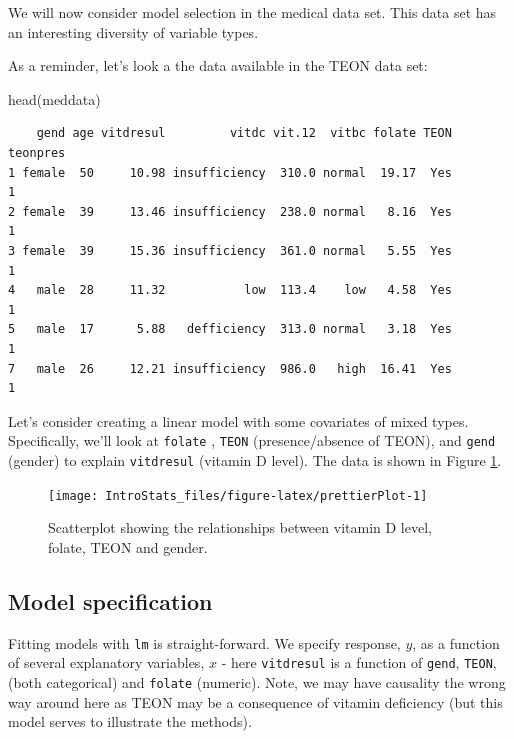 \documentclass[
  oneside]{krantz}
\newenvironment{Shaded}{\begin{snugshade}}{\end{snugshade}}
\newcommand{\FunctionTok}[1]{\textcolor[rgb]{0.00,0.00,0.00}{#1}}
\newcommand{\NormalTok}[1]{#1}
\begin{document}
We will now consider model selection in the medical data set. This data set has an interesting diversity of variable types.

As a reminder, let's look a the data available in the TEON data set:

\begin{Shaded}
\begin{Highlighting}[]
\FunctionTok{head}\NormalTok{(meddata)}
\end{Highlighting}
\end{Shaded}

\begin{verbatim}
    gend age vitdresul         vitdc vit.12  vitbc folate TEON teonpres
1 female  50     10.98 insufficiency  310.0 normal  19.17  Yes        1
2 female  39     13.46 insufficiency  238.0 normal   8.16  Yes        1
3 female  39     15.36 insufficiency  361.0 normal   5.55  Yes        1
4   male  28     11.32           low  113.4    low   4.58  Yes        1
5   male  17      5.88   defficiency  313.0 normal   3.18  Yes        1
7   male  26     12.21 insufficiency  986.0   high  16.41  Yes        1
\end{verbatim}

Let's consider creating a linear model with some covariates of mixed types. Specifically, we'll look at \texttt{folate} , \texttt{TEON} (presence/absence of TEON), and \texttt{gend} (gender) to explain \texttt{vitdresul} (vitamin D level). The data is shown in Figure \ref{fig:prettierPlot}.

\begin{figure}

{\centering \texttt{[image: IntroStats\_files/figure-latex/prettierPlot-1]} 

}

\caption{Scatterplot showing the relationships between vitamin D level, folate, TEON and gender.}\label{fig:prettierPlot}
\end{figure}

\hypertarget{model-specification-3}{%
\subsection{Model specification}\label{model-specification-3}}

Fitting models with \texttt{lm} is straight-forward. We specify response, \(y\), as a function of several explanatory variables, \(x\) - here \texttt{vitdresul} is a function of \texttt{gend}, \texttt{TEON}, (both categorical) and \texttt{folate} (numeric). Note, we may have causality the wrong way around here as TEON may be a consequence of vitamin deficiency (but this model serves to illustrate the methods).
\end{document}
